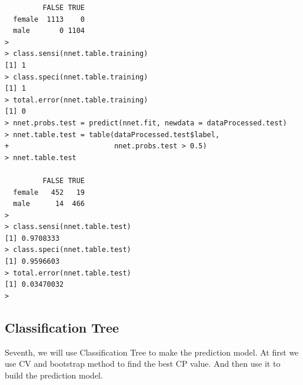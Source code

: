 \documentclass{article}%
\begin{document}
\begin{verbatim}
         FALSE TRUE
  female  1113    0
  male       0 1104
>
> class.sensi(nnet.table.training)
[1] 1
> class.speci(nnet.table.training)
[1] 1
> total.error(nnet.table.training)
[1] 0
> nnet.probs.test = predict(nnet.fit, newdata = dataProcessed.test)
> nnet.table.test = table(dataProcessed.test$label,
+                         nnet.probs.test > 0.5)
> nnet.table.test

         FALSE TRUE
  female   452   19
  male      14  466
>
> class.sensi(nnet.table.test)
[1] 0.9708333
> class.speci(nnet.table.test)
[1] 0.9596603
> total.error(nnet.table.test)
[1] 0.03470032
> \end{verbatim}
\subsection{Classification Tree}
Seventh, we will use Classification Tree to make the prediction model. At first we use CV and bootstrap method to find the best CP value. And then use it to build the prediction model.
\end{document}
